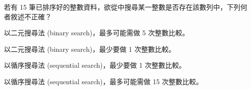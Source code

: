 \ifx\ntpcNinetyThree\undefined[93學年基北區] \fi
若有 15 筆已排序好的整數資料，欲從中搜尋某一整數是否存在該數列中，下列何者敘述不正確？
  \begin{optionlist}
  \item 以二元搜尋法 (binary search)，最多可能需做 5 次整數比較。\label{ntpc-93-a7}
  \item 以二元搜尋法 (binary search)，最少要做 1 次整數比較。
  \item 以循序搜尋法 (sequential search)，最少要做 1 次整數比較。
  \item 以循序搜尋法 (sequential search)，最多可能需做 15 次整數比較。
  \end{optionlist}